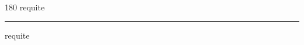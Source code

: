 
\begin{frame}
\begin{center}
\begin{turn}{180}
{\fontsize{2.5cm}{1em}\selectfont requite}
\end{turn}
\vspace{1em}\par  
\hrule
\vspace{1em}\par  
{\fontsize{2.5cm}{1em}\selectfont requite}
\end{center}
\end{frame}
